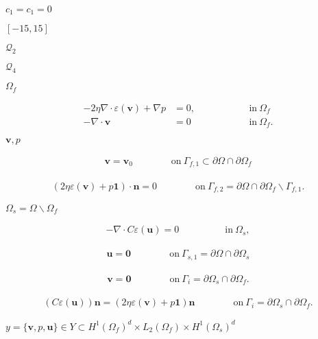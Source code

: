 \documentclass{article}
\begin{document}
$c_1=c_1=0$
\pagebreak

$[-15,15]$
\pagebreak

$\mathcal{Q}_2$
\pagebreak

$\mathcal{Q}_4$
\pagebreak

$\Omega_f$
\pagebreak

\begin{align*} -2\eta\nabla \cdot \varepsilon(\mathbf v) + \nabla p &= 0, \qquad \qquad && \text{in}\ \Omega_f\\ -\nabla \cdot \mathbf v &= 0 && \text{in}\ \Omega_f. \end{align*}
\pagebreak

$\mathbf v, p$
\pagebreak

\begin{align*} \mathbf v = \mathbf v_0 \qquad\qquad \text{on}\ \Gamma_{f,1} \subset \partial\Omega \cap \partial\Omega_f \end{align*}
\pagebreak

\begin{align*} (2\eta \varepsilon(\mathbf v) + p \mathbf 1) \cdot \mathbf n = 0 \qquad\qquad \text{on}\ \Gamma_{f,2} = \partial\Omega \cap \partial\Omega_f \backslash \Gamma_{f,1}. \end{align*}
\pagebreak

$\Omega_s = \Omega \backslash \Omega_f$
\pagebreak

\begin{align*} -\nabla \cdot C \varepsilon(\mathbf u) = 0 \qquad\qquad & \text{in}\ \Omega_s, \end{align*}
\pagebreak

\begin{align*} \mathbf u = \mathbf 0 \qquad\qquad \text{on}\ \Gamma_{s,1} = \partial\Omega \cap \partial\Omega_s \end{align*}
\pagebreak

\begin{align*} \mathbf v = \mathbf 0 \qquad\qquad \text{on}\ \Gamma_{i} = \partial\Omega_s \cap \partial\Omega_f. \end{align*}
\pagebreak

\begin{align*} (C \varepsilon(\mathbf u)) \mathbf n = (2 \eta \varepsilon(\mathbf v) + p \mathbf 1) \mathbf n \qquad\qquad \text{on}\ \Gamma_{i} = \partial\Omega_s \cap \partial\Omega_f. \end{align*}
\pagebreak

$y = \{\mathbf v, p, \mathbf u\} \in Y \subset H^1(\Omega_f)^d \times L_2(\Omega_f) \times H^1(\Omega_s)^d$
\pagebreak
\end{document}
